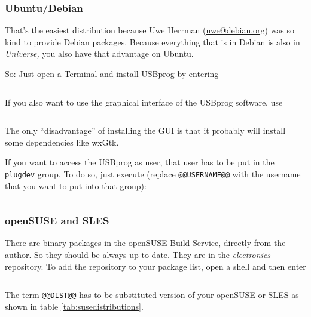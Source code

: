 \documentclass[bibtotoc,UKenglish,halfparskip,oneside,DIV12]{scrreprt}
\begin{document}
\subsubsection{Ubuntu/Debian}

That's the easiest distribution because Uwe Herrman (\url{uwe@debian.org}) was so kind to provide
Debian packages. Because everything that is in Debian is also in \emph{Universe,} you also have that
advantage on Ubuntu.

So: Just open a Terminal and install USBprog by entering

\begin{lstlisting}[style=inline]
% sudo aptitude install usbprog
\end{lstlisting}

If you also want to use the graphical interface of the USBprog software, use

\begin{lstlisting}[style=inline]
% sudo aptitude install usbprog usbprog-gui
\end{lstlisting}

The only ``disadvantage'' of installing the GUI is that it probably will install some dependencies
like wxGtk.

If you want to access the USBprog as user, that user has to be put in the \texttt{plugdev} group. To
do so, just execute (replace \texttt{@@USERNAME@@} with the username that you want to put into that
group):

\begin{lstlisting}[style=inline]
% sudo usermod -aG plugdev @@USERNAME@@
\end{lstlisting}

\subsubsection{openSUSE and SLES}

There are binary packages in the \href{https://build.opensuse.org/}{openSUSE Build Service},
directly from the author. So they should be always up to date. They are in the \emph{electronics}
repository. To add the repository to your package list, open a shell and then enter

\begin{lstlisting}[style=inline]
% sudo zypper ar -r http://repos.opensuse.org/electronics/@@DIST@@/electronics.repo
\end{lstlisting}

The term \texttt{@@DIST@@} has to be substituted version of your openSUSE or SLES as shown in table
\vref{tab:susedistributions}.
\end{document}
